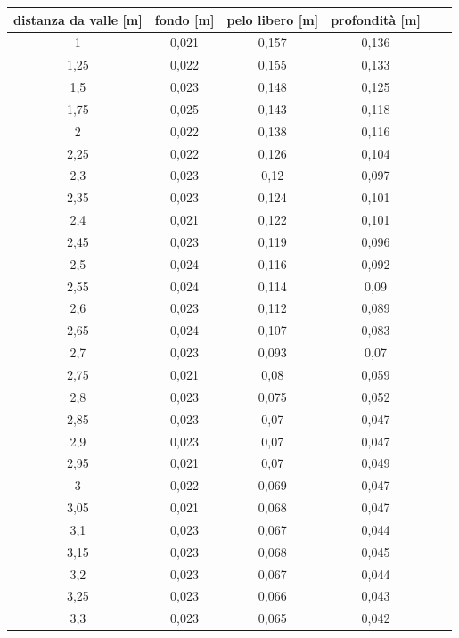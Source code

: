 \documentclass[12pt]{article} %
\begin{document}
\newpage
\vspace*{\fill}
\begin{table}[H]
\scriptsize\sffamily
\centering
\begin{tabular}{cccccc}
\textbf{distanza da valle {[}m{]}}  & \textbf{fondo {[}m{]}}              & \textbf{pelo libero {[}m{]}}        & \textbf{profondità {[}m{]}}         &  &  \\\hline
 1     &  0,021 &  0,157 &  0,136 &  &  \\
 1,25  &  0,022 &  0,155 &  0,133 &  &  \\
 1,5   &  0,023 &  0,148 &  0,125 &  &  \\
 1,75  &  0,025 &  0,143 &  0,118 &  &  \\
 2     &  0,022 &  0,138 &  0,116 &  &  \\
 2,25  &  0,022 &  0,126 &  0,104 &  &  \\
 2,3   &  0,023 &  0,12  &  0,097 &  &  \\
 2,35  &  0,023 &  0,124 &  0,101 &  &  \\
 2,4   &  0,021 &  0,122 &  0,101 &  &  \\
 2,45  &  0,023 &  0,119 &  0,096 &  &  \\
 2,5   &  0,024 &  0,116 &  0,092 &  &  \\
 2,55  &  0,024 &  0,114 &  0,09  &  &  \\
 2,6   &  0,023 &  0,112 &  0,089 &  &  \\
 2,65  &  0,024 &  0,107 &  0,083 &  &  \\
 2,7   &  0,023 &  0,093 &  0,07  &  &  \\
 2,75  &  0,021 &  0,08  &  0,059 &  &  \\
 2,8   &  0,023 &  0,075 &  0,052 &  &  \\
 2,85  &  0,023 &  0,07  &  0,047 &  &  \\
 2,9   &  0,023 &  0,07  &  0,047 &  &  \\
 2,95  &  0,021 &  0,07  &  0,049 &  &  \\
 3     &  0,022 &  0,069 &  0,047 &  &  \\
 3,05  &  0,021 &  0,068 &  0,047 &  &  \\
 3,1   &  0,023 &  0,067 &  0,044 &  &  \\
 3,15  &  0,023 &  0,068 &  0,045 &  &  \\
 3,2   &  0,023 &  0,067 &  0,044 &  &  \\
 3,25  &  0,023 &  0,066 &  0,043 &  &  \\
 3,3   &  0,023 &  0,065 &  0,042 &  &  \\

\end{tabular}
\end{table}
\end{document}
